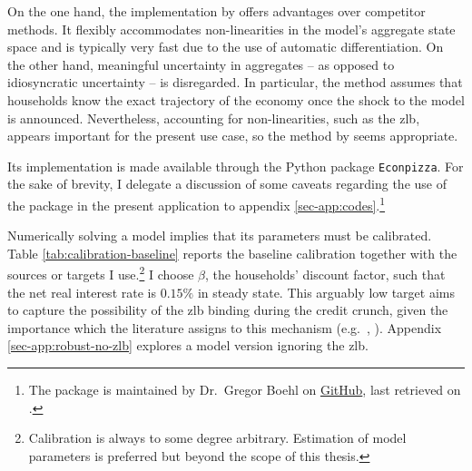 \documentclass[a4paper,12pt]{article} %
\numberwithin{equation}{section} %
\numberwithin{figure}{section}
\numberwithin{table}{section}
\begin{document}
On the one hand, the implementation by \textcite{boehl2023econpizza} offers advantages over competitor methods. It flexibly accommodates non-linearities in the model's aggregate state space and is typically very fast due to the use of automatic differentiation. On the other hand, meaningful uncertainty in aggregates -- as opposed to idiosyncratic uncertainty -- is disregarded. In particular, the method assumes that households know the exact trajectory of the economy once the shock to the model is announced. Nevertheless, accounting for non-linearities, such as the \Gls{zlb}, appears important for the present use case, so the method by \textcite{boehl2023econpizza} seems appropriate.

Its implementation is made available through the Python package \texttt{Econpizza}. For the sake of brevity, I delegate a discussion of some caveats regarding the use of the package in the present application to appendix \ref{sec-app:codes}.\footnote{The package is maintained by Dr.~Gregor Boehl on \href{https://github.com/gboehl/econpizza}{GitHub}, last retrieved on .}

Numerically solving a model implies that its parameters must be calibrated. Table \ref{tab:calibration-baseline} reports the baseline calibration together with the sources or targets I use.\footnote{Calibration is always to some degree arbitrary. Estimation of model parameters is preferred but beyond the scope of this thesis.} I choose $\beta$, the households' discount factor, such that the net real interest rate is $0.15\%$ in steady state. This arguably low target aims to capture the possibility of the \Gls{zlb} binding during the credit crunch, given the importance which the literature assigns to this mechanism (e.g.~\cite{egg2012}, \cite{gl2017}). Appendix \ref{sec-app:robust-no-zlb} explores a model version ignoring the \Gls{zlb}.
\end{document}
